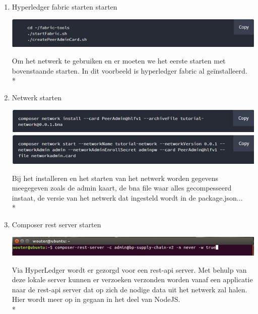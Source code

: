 \documentclass[fleqn,a4paper,12pt]{book}
\begin{document}
\begin{enumerate}
	\item Hyperledger fabric starten starten
	\begin{center}
		\includegraphics[width=13cm]{img/start-fabric}\\[1cm]
	\end{center}
	Om het netwerk te gebruiken en er moeten we het eerste starten met bovenstaande starten. In dit voorbeeld is hyperledger fabric al geïnstalleerd.\\*
	\item Netwerk starten
	\begin{center}
		\includegraphics[width=13cm]{img/install-network}\\[1cm]
		\includegraphics[width=13cm]{img/start-network}\\[1cm]
	\end{center}
	Bij het installeren en het starten van het netwerk worden gegevens meegegeven zoals de admin kaart, de bna file waar alles gecompesseerd instaat, de versie van het netwerk dat ingesteld wordt in de package.json...\\*
	\item Composer rest server starten
	\begin{center}
		\includegraphics[width=13cm]{img/start-rest}\\[1cm]
	\end{center}
	Via HyperLedger wordt er gezorgd voor een rest-api server. Met behulp van deze lokale server kunnen er verzoeken verzonden worden vanaf een applicatie naar de rest-api server dat op zich de nodige data uit het netwerk zal halen. Hier wordt meer op in gegaan in het deel van NodeJS.\\*
\end{enumerate}
\end{document}
